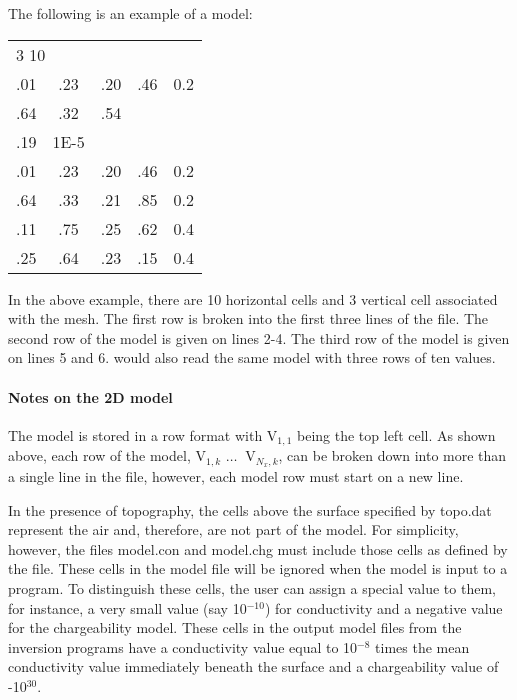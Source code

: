The following is an example of a model:

\begin{fileExample}
\begin{tabular}{|ccccc|}
\hline
\multicolumn{5}{|l|}{3 10} \\
.01 & .23 & .20 & .46 & 0.2 \\
.64 & .32 & .54 &  & \\
.19 & 1E-5 & & &\\
.01 & .23 & .20 & .46 & 0.2 \\
.64 & .33 & .21 & .85 & 0.2 \\
.11 & .75 & .25 & .62 & 0.4 \\
.25 & .64 & .23 & .15 & 0.4 \\
\hline
\end{tabular}
\end{fileExample}

In the above example, there are 10 horizontal cells and 3 vertical cell associated with the mesh. The first row is broken into the first three lines of the file. The second row of the model is given on lines 2-4. The third row of the model is given on lines 5 and 6.  would also read the same model with three rows of ten values. 

\paragraph{Notes on the 2D model} The model is stored in a row format with V$_{1,1}$ being the top left cell. As shown above, each row of the model, V$_{1,k}$ $ \hdots\ $ V$_{N_x,k}$, can be broken down into more than a single line in the file, however, each model row must start on a new line.

In the presence of topography, the cells above the surface specified by topo.dat represent the air and, therefore, are not part of the model. For simplicity, however, the files model.con and model.chg must include those cells as defined by the  file. These cells in the model file will be ignored when the model is input to a program. To distinguish these cells, the user can assign a special value to them, for instance, a very small value (say 10$^{-10}$) for conductivity and a negative value for the chargeability model. These cells in the output model files from the inversion programs have a conductivity value equal to 10$^{-8}$ times the mean conductivity value immediately beneath the surface and a chargeability value of -10$^{30}$.
